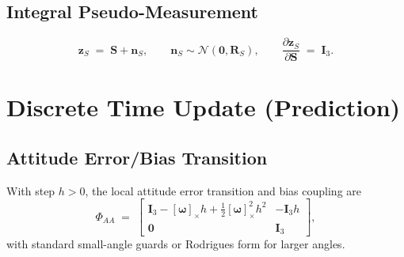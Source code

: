 \documentclass[11pt]{article}
\newcommand{\vect}[1]{\bm{#1}}
\newcommand{\mat}[1]{\bm{#1}}
\newcommand{\I}{\mat{I}}
\newcommand{\skew}[1]{\left[ #1 \right]_\times}
\begin{document}
\subsection{Integral Pseudo-Measurement}
\begin{equation}
  \vect{z}_S \;=\; \vect{S} + \vect{n}_S, \qquad
  \vect{n}_S \sim \mathcal{N}(\vect{0},\mat{R}_S), \qquad
  \frac{\partial \vect{z}_S}{\partial \vect{S}} \;=\; \I_3.
  \label{eq:S-pseudo}
\end{equation}

\section{Discrete Time Update (Prediction)}
\label{sec:discrete-pred}

\subsection{Attitude Error/Bias Transition}
With step \(h>0\), the local attitude error transition and bias coupling are
\begin{equation}
  \Phi_{AA} \;=\;
  \begin{bmatrix}
    \I_3 - \skew{\vect{\omega}} h + \tfrac12 \skew{\vect{\omega}}^2 h^2 & -\I_3 h \\
    \mat{0} & \I_3
  \end{bmatrix},
  \label{eq:PhiAA}
\end{equation}
with standard small-angle guards or Rodrigues form for larger angles.
\end{document}
